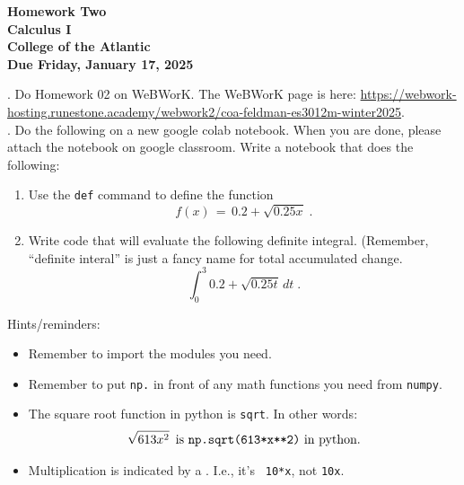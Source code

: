 \documentclass[12pt]{article}
\begin{document}
\pagestyle{empty}
 
\begin{center}
{\LARGE {\bf Homework Two}}\\
\bigskip
{\Large {\bf Calculus I}}\\
\bigskip
{\Large {\bf College of the Atlantic}}\\
\bigskip
{ {\bf Due Friday, January 17, 2025}}\\ 
\end{center}
\medskip



.  Do Homework 02 on WeBWorK. The
WeBWorK page is here:
\url{https://webwork-hosting.runestone.academy/webwork2/coa-feldman-es3012m-winter2025}. \\ 



. Do the following on a new
google colab notebook. When you are done, please attach the notebook
on google classroom. Write a notebook that does the following:


\begin{enumerate}
  \setlength{\itemsep}{-1mm}
\item Use the {\tt def} command to define the function
  \begin{equation}
    f(x) \, = \, 0.2 + \sqrt{0.25x} \;.
  \end{equation}
\item Write code that will evaluate the following definite
  integral. (Remember, ``definite interal'' is just a fancy name for
  total accumulated change.
  \begin{equation}
    \int_0^3 0.2 + \sqrt{0.25t} \, dt \;.
  \end{equation}
\end{enumerate}

\noindent Hints/reminders:
\begin{itemize}
  \setlength{\itemsep}{-1mm}
\item Remember to import the modules you need.
\item Remember to put {\tt np.} in front of any math functions you
  need from {\tt numpy}.
\item The square root function in python is {\tt sqrt}. In other words: 
  \begin{equation}
    \sqrt{613x^2} \, \text{ is {\tt np.sqrt(613*x**2)} in python.}
  \end{equation}
\item Multiplication is indicated by a {\tt *}.  I.e., it's {\tt
  10*x}, not {\tt 10x}. \\
\end{itemize}
\end{document}
